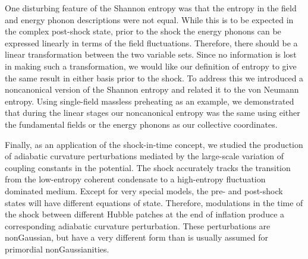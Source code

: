 \documentclass[11pt,a4paper]{article}
\begin{document}
One disturbing feature of the Shannon entropy was that the entropy in the field and energy phonon descriptions were not equal.
While this is to be expected in the complex post-shock state,
prior to the shock the energy phonons can be expressed linearly in terms of the field fluctuations.
Therefore, there should be a linear transformation between the two variable sets.
Since no information is lost in making such a transformation, 
we would like our definition of entropy to give the same result in either basis prior to the shock.
To address this we introduced a noncanonical version of the Shannon entropy and related it to the von Neumann entropy.
Using single-field massless preheating as an example, we demonstrated that during the linear stages our noncanonical entropy was the same using either the fundamental fields or the energy phonons as our collective coordinates.

Finally, as an application of the shock-in-time concept, we studied the production of adiabatic curvature perturbations mediated by the large-scale variation of coupling constants in the potential.
The shock accurately tracks the transition from the low-entropy coherent condensate to a high-entropy fluctuation dominated medium.
Except for very special models, the pre- and post-shock states will have different equations of state.
Therefore, modulations in the time of the shock between different Hubble patches at the end of inflation produce a corresponding adiabatic curvature perturbation.
These perturbations are nonGaussian, but have a very different form than is usually assumed for primordial nonGaussianities.
\end{document}
